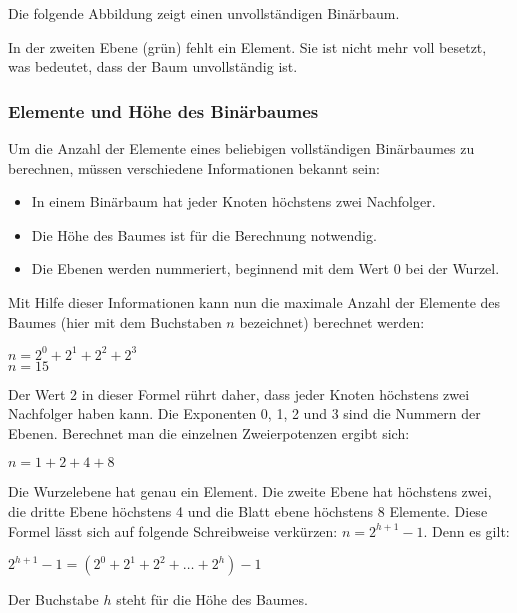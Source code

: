           Die folgende Abbildung zeigt einen unvollständigen Binärbaum.
          \begin{center}
          \end{center}
          In der zweiten Ebene (grün) fehlt ein Element. Sie ist nicht mehr voll besetzt, was bedeutet, dass der Baum unvollständig ist.
        \subsubsection{Elemente und Höhe des Binärbaumes}
          Um die Anzahl der Elemente eines beliebigen vollständigen Binärbaumes zu berechnen, müssen verschiedene Informationen bekannt sein:
          \begin{itemize}
            \item In einem Binärbaum hat jeder Knoten höchstens zwei Nachfolger.
            \item Die Höhe des Baumes ist für die Berechnung notwendig.
            \item Die Ebenen werden nummeriert, beginnend mit dem Wert 0 bei der Wurzel.
          \end{itemize}
          Mit Hilfe dieser Informationen kann nun die maximale Anzahl der Elemente des Baumes (hier mit dem Buchstaben $n$ bezeichnet) berechnet werden:
          \begin{center}
            $ n = 2^0 + 2^1 + 2^2 + 2^3$ \\
            $ n = 15$
          \end{center}
          Der Wert 2 in dieser Formel rührt daher, dass jeder Knoten höchstens zwei Nachfolger haben kann. Die Exponenten 0, 1, 2 und 3 sind die Nummern der Ebenen. Berechnet man die einzelnen Zweierpotenzen ergibt sich:
          \begin{center}
          $ n= 1 + 2 + 4 + 8$
          \end{center}
          Die Wurzelebene hat genau ein Element. Die zweite Ebene hat höchstens zwei, die dritte Ebene höchstens 4 und die Blatt ebene höchstens 8 Elemente. Diese Formel lässt sich auf folgende Schreibweise verkürzen: $n = 2^{h + 1} - 1$. Denn es gilt:
          \begin{center}
          $ 2^{h+1}-1 = (2^0 + 2^1 + 2^2 + \dots + 2^h) - 1$
          \end{center}
          Der Buchstabe $h$ steht für die Höhe des Baumes.


